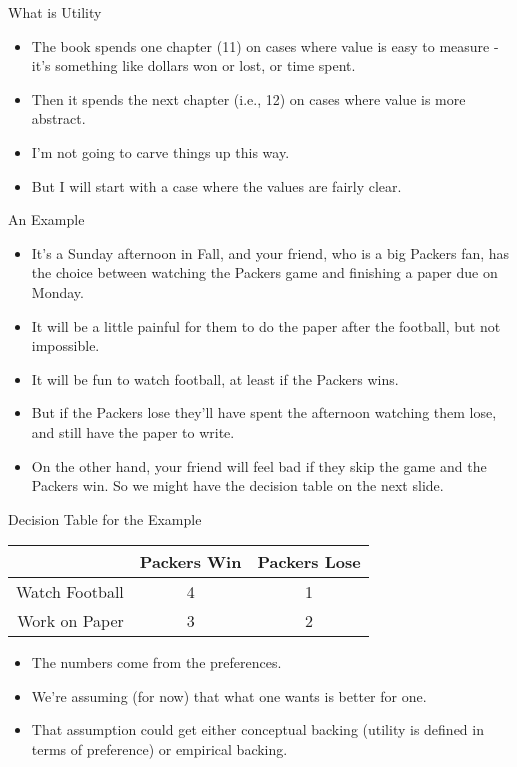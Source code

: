 \documentclass[
  ignorenonframetext,
]{beamer}
\providecommand{\tightlist}{%
  \setlength{\itemsep}{0pt}\setlength{\parskip}{0pt}}
\renewcommand{\,}{\text{, }}
\begin{document}
\begin{frame}{What is Utility}
\protect\hypertarget{what-is-utility}{}

\begin{itemize}
\tightlist
\item
  The book spends one chapter (11) on cases where value is easy to
  measure - it's something like dollars won or lost, or time spent.
\item
  Then it spends the next chapter (i.e., 12) on cases where value is
  more abstract.
\item
  I'm not going to carve things up this way.
\item
  But I will start with a case where the values are fairly clear.
\end{itemize}

\end{frame}

\begin{frame}{An Example}
\protect\hypertarget{an-example}{}

\begin{itemize}
\tightlist
\item
  It's a Sunday afternoon in Fall, and your friend, who is a big Packers
  fan, has the choice between watching the Packers game and finishing a
  paper due on Monday.
\item
  It will be a little painful for them to do the paper after the
  football, but not impossible.
\item
  It will be fun to watch football, at least if the Packers wins.
\item
  But if the Packers lose they'll have spent the afternoon watching them
  lose, and still have the paper to write.
\item
  On the other hand, your friend will feel bad if they skip the game and
  the Packers win. So we might have the decision table on the next
  slide.
\end{itemize}

\end{frame}

\begin{frame}{Decision Table for the Example}
\protect\hypertarget{decision-table-for-the-example}{}

\begin{longtable}[]{@{}rcc@{}}
\toprule
& Packers Win & Packers Lose\tabularnewline
\midrule
\endhead
Watch Football & 4 & 1\tabularnewline
Work on Paper & 3 & 2\tabularnewline
\bottomrule
\end{longtable}

\begin{itemize}
\tightlist
\item
  The numbers come from the preferences.
\item
  We're assuming (for now) that what one wants is better for one.
\item
  That assumption could get either conceptual backing (utility is
  defined in terms of preference) or empirical backing.
\end{itemize}

\end{frame}
\end{document}
